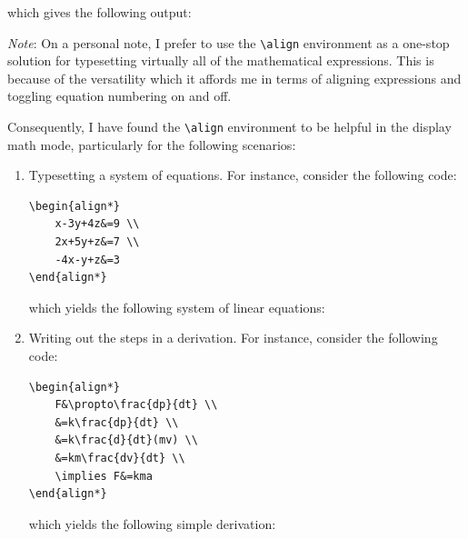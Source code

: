 		which gives the following output:
		\setcounter{equation}{0}
		
		\newpage
		\emph{Note}: On a personal note, I prefer to use the \lstinline|\align| environment as a one-stop solution for typesetting virtually all of the mathematical expressions. This is because of the versatility which it affords me in terms of aligning expressions and toggling equation numbering on and off.
		
		Consequently, I have found the \lstinline|\align| environment to be helpful in the display math mode, particularly for the following scenarios:
		\begin{enumerate}
			\item Typesetting a system of equations. For instance, consider the following code:
\begin{lstlisting}
\begin{align*}
	x-3y+4z&=9 \\
	2x+5y+z&=7 \\
	-4x-y+z&=3
\end{align*}
\end{lstlisting}
			which yields the following system of linear equations:
			\item Writing out the steps in a derivation. For instance, consider the following code:
\begin{lstlisting}
\begin{align*}
	F&\propto\frac{dp}{dt} \\
	&=k\frac{dp}{dt} \\
	&=k\frac{d}{dt}(mv) \\
	&=km\frac{dv}{dt} \\
	\implies F&=kma
\end{align*}
\end{lstlisting}
			which yields the following simple derivation:
		\end{enumerate}